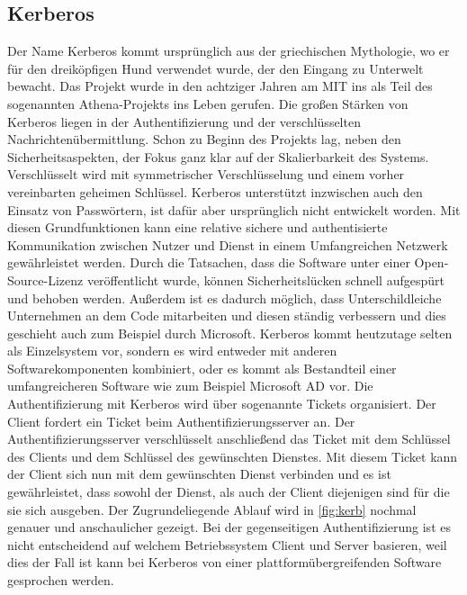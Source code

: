 \documentclass[
a4paper,   
titlepage,  
halfparskip,
12pt        
]{scrartcl}
\begin{document}
\begin{onehalfspacing}
\subsection{Kerberos}
Der Name Kerberos kommt ursprünglich aus der griechischen Mythologie, wo er für den dreiköpfigen Hund verwendet wurde, der den Eingang zu Unterwelt bewacht. 
Das Projekt wurde in den achtziger Jahren am \ac{MIT} ins als Teil des sogenannten Athena-Projekts ins Leben gerufen. Die großen Stärken von Kerberos liegen in der Authentifizierung und der verschlüsselten Nachrichtenübermittlung. Schon zu Beginn des Projekts lag, neben den Sicherheitsaspekten, der Fokus ganz klar auf der Skalierbarkeit des Systems. 
Verschlüsselt wird mit symmetrischer Verschlüsselung und einem vorher vereinbarten geheimen Schlüssel. Kerberos unterstützt inzwischen auch den Einsatz von Passwörtern, ist dafür aber ursprünglich nicht entwickelt worden. 
Mit diesen Grundfunktionen kann eine relative sichere und authentisierte Kommunikation zwischen Nutzer und Dienst in einem Umfangreichen Netzwerk gewährleistet werden.\newline
Durch die Tatsachen, dass die Software unter einer Open-Source-Lizenz veröffentlicht wurde, können Sicherheitslücken schnell aufgespürt und behoben werden. Außerdem ist es dadurch möglich, dass Unterschildleiche Unternehmen an dem Code mitarbeiten und diesen ständig verbessern und dies geschieht auch zum Beispiel durch Microsoft. Kerberos kommt heutzutage selten als Einzelsystem vor, sondern es wird entweder mit anderen Softwarekomponenten kombiniert, oder es kommt als Bestandteil einer umfangreicheren Software wie zum Beispiel Microsoft \ac{AD} vor.\cite[S. 137f]{kerberos2}\newline
Die Authentifizierung mit Kerberos wird über sogenannte Tickets organisiert. Der Client fordert ein Ticket beim Authentifizierungsserver an. Der Authentifizierungsserver verschlüsselt anschließend das Ticket mit dem Schlüssel des Clients und dem Schlüssel des gewünschten Dienstes. Mit diesem Ticket kann der Client sich nun mit dem gewünschten Dienst verbinden und es ist gewährleistet, dass sowohl der Dienst, als auch der Client diejenigen sind für die sie sich ausgeben.  Der Zugrundeliegende Ablauf wird in \autoref{fig:kerb} nochmal genauer und anschaulicher gezeigt. Bei der gegenseitigen Authentifizierung ist es nicht entscheidend auf welchem Betriebssystem Client und Server basieren, weil dies der Fall ist kann bei Kerberos von einer plattformübergreifenden Software gesprochen werden.
\begin{figure}[h]

\end{figure}
\end{onehalfspacing}
\end{document}
